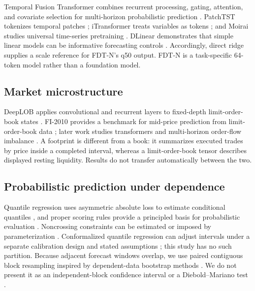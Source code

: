 \documentclass[10pt]{article}
\begin{document}
Temporal Fusion Transformer combines recurrent processing, gating, attention, and covariate
selection for multi-horizon probabilistic prediction \citep{lim2021tft}. PatchTST tokenizes temporal
patches \citep{nie2023patchtst}; iTransformer treats variables as tokens \citep{liu2024itransformer};
and Moirai studies universal time-series pretraining \citep{woo2024moirai}. DLinear demonstrates that
simple linear models can be informative forecasting controls \citep{zeng2023dlinear}. Accordingly,
direct ridge supplies a scale reference for FDT-N's q50 output. FDT-N is a task-specific 64-token
model rather than a foundation model.

\subsection{Market microstructure}

DeepLOB applies convolutional and recurrent layers to fixed-depth limit-order-book states
\citep{zhang2019deeplob}. FI-2010 provides a benchmark for mid-price prediction from limit-order-book
data \citep{ntakaris2018benchmark}; later work studies transformers and multi-horizon order-flow
imbalance \citep{wallbridge2020transformers,kolm2023orderflow}. A footprint is different from a book:
it summarizes executed trades by price inside a completed interval, whereas a limit-order-book tensor
describes displayed resting liquidity. Results do not transfer automatically between the two.

\subsection{Probabilistic prediction under dependence}

Quantile regression uses asymmetric absolute loss to estimate conditional quantiles
\citep{koenker1978quantile}, and proper scoring rules provide a principled basis for probabilistic
evaluation \citep{gneiting2007probabilistic}. Noncrossing constraints can be estimated or imposed by
parameterization \citep{bondell2010noncrossing}. Conformalized quantile regression can adjust
intervals under a separate calibration design and stated assumptions \citep{romano2019cqr}; this
study has no such partition. Because adjacent forecast windows overlap, we use paired contiguous
block resampling inspired by dependent-data bootstrap methods \citep{kunsch1989bootstrap}. We do not
present it as an independent-block confidence interval or a Diebold--Mariano test
\citep{diebold1995predictive}.
\end{document}
